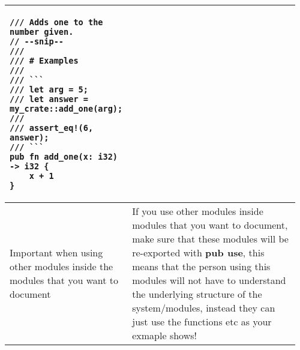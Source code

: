 \documentclass[main.tex,fontsize=8pt,paper=a4,paper=portrait,DIV=calc,]{scrartcl}
\begin{document}
\begin{table}[ht!]
\begin{tabular}{|m{0.2\linewidth}|m{0.755\linewidth}|}
\begin{lstlisting}
/// Adds one to the number given.
// --snip--
///
/// # Examples
///
/// ```
/// let arg = 5;
/// let answer = my_crate::add_one(arg);
///
/// assert_eq!(6, answer);
/// ```
pub fn add_one(x: i32) -> i32 {
    x + 1
}
\end{lstlisting}\\
\hline
Important when using other modules inside the modules that you want to document &
If you use other modules inside modules that you want to document, make sure that these modules will be re-exported with \textbf{pub use}, this means that the person using this modules will not have to understand the underlying structure of the system/modules, instead they can just use the functions etc as your exmaple shows!\\
\hline
\end{tabular}
\end{table}
\pagebreak
\end{document}
